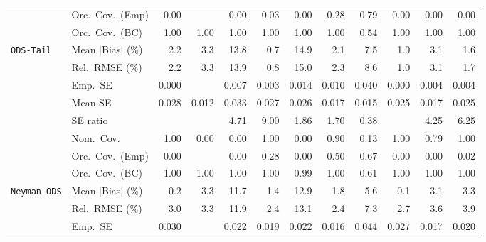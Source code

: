 \begin{landscape}
\begin{longtable}{llrrrrrrrrrr}
 & Orc.\ Cov.\ (Emp) & 0.00 &  & 0.00 & \cellcolor{rankthree}0.03 & 0.00 & \cellcolor{ranktwo}0.28 & \cellcolor{rankone}0.79 & 0.00 & 0.00 & 0.00 \\
 & Orc.\ Cov.\ (BC) & \cellcolor{rankone}1.00 & \cellcolor{rankone}1.00 & \cellcolor{rankone}1.00 & \cellcolor{rankone}1.00 & \cellcolor{rankone}1.00 & \cellcolor{rankone}1.00 & \cellcolor{ranktwo}0.54 & \cellcolor{rankone}1.00 & \cellcolor{rankone}1.00 & \cellcolor{rankone}1.00 \\
\addlinespace[2pt]
\quad \texttt{ODS-Tail} & Mean $|$Bias$|$ (\%) & 2.2 & 3.3 & 13.8 & \cellcolor{rankone}0.7 & 14.9 & 2.1 & 7.5 & \cellcolor{ranktwo}1.0 & 3.1 & \cellcolor{rankthree}1.6 \\
 & Rel.\ RMSE (\%) & 2.2 & 3.3 & 13.9 & \cellcolor{rankone}0.8 & 15.0 & 2.3 & 8.6 & \cellcolor{ranktwo}1.0 & 3.1 & \cellcolor{rankthree}1.7 \\
 & Emp.\ SE & 0.000 &  & 0.007 & 0.003 & 0.014 & 0.010 & 0.040 & 0.000 & 0.004 & 0.004 \\
 & Mean SE & 0.028 & 0.012 & 0.033 & 0.027 & 0.026 & 0.017 & 0.015 & 0.025 & 0.017 & 0.025 \\
 & SE ratio &  &  & 4.71 & 9.00 & \cellcolor{rankthree}1.86 & \cellcolor{ranktwo}1.70 & \cellcolor{rankone}0.38 &  & 4.25 & 6.25 \\
 & Nom.\ Cov. & \cellcolor{rankone}1.00 & 0.00 & 0.00 & \cellcolor{rankone}1.00 & 0.00 & \cellcolor{rankone}0.90 & \cellcolor{rankthree}0.13 & \cellcolor{rankone}1.00 & \cellcolor{ranktwo}0.79 & \cellcolor{rankone}1.00 \\
 & Orc.\ Cov.\ (Emp) & 0.00 &  & 0.00 & \cellcolor{rankthree}0.28 & 0.00 & \cellcolor{ranktwo}0.50 & \cellcolor{rankone}0.67 & 0.00 & 0.00 & 0.02 \\
 & Orc.\ Cov.\ (BC) & \cellcolor{ranktwo}1.00 & \cellcolor{ranktwo}1.00 & \cellcolor{ranktwo}1.00 & \cellcolor{ranktwo}1.00 & \cellcolor{rankone}0.99 & \cellcolor{ranktwo}1.00 & \cellcolor{rankthree}0.61 & \cellcolor{ranktwo}1.00 & \cellcolor{ranktwo}1.00 & \cellcolor{ranktwo}1.00 \\
\addlinespace[2pt]
\quad \texttt{Neyman-ODS} & Mean $|$Bias$|$ (\%) & \cellcolor{ranktwo}0.2 & 3.3 & 11.7 & \cellcolor{rankthree}1.4 & 12.9 & 1.8 & 5.6 & \cellcolor{rankone}0.1 & 3.1 & 3.3 \\
 & Rel.\ RMSE (\%) & \cellcolor{rankthree}3.0 & 3.3 & 11.9 & \cellcolor{rankone}2.4 & 13.1 & \cellcolor{rankone}2.4 & 7.3 & \cellcolor{ranktwo}2.7 & 3.6 & 3.9 \\
 & Emp.\ SE & 0.030 &  & 0.022 & 0.019 & 0.022 & 0.016 & 0.044 & 0.027 & 0.017 & 0.020 \\

\end{longtable}
\end{landscape}
